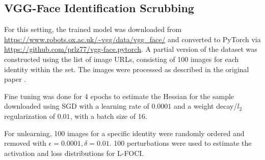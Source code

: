 \subsection{VGG-Face Identification Scrubbing}
For this setting, the trained model was downloaded from \url{https://www.robots.ox.ac.uk/~vgg/data/vgg_face/} and converted to PyTorch via \url{https://github.com/prlz77/vgg-face.pytorch}. A partial version of the dataset was constructed using the list of image URLs, consisting of 100 images for each identity within the set. The images were processed as described in the original paper \cite{Parkhi15}.

Fine tuning was done for 4 epochs to estimate the Hessian for the sample downloaded using SGD with a learning rate of $0.0001$ and a weight decay/$l_2$ regularization of $0.01$, with a batch size of 16.

For unlearning, 100 images for a specific identity were randomly ordered and removed with $\epsilon=0.0001, \delta=0.01$. 100 perturbations were used to estimate the activation and loss distributions for L-FOCI.

